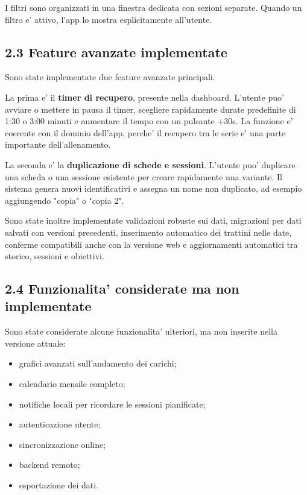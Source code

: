 \documentclass[11pt,a4paper]{article}
\begin{document}
I filtri sono organizzati in una finestra dedicata con sezioni separate. Quando un filtro e' attivo, l'app lo mostra esplicitamente all'utente.

\subsection{2.3 Feature avanzate implementate}

Sono state implementate due feature avanzate principali.

La prima e' il \textbf{timer di recupero}, presente nella dashboard. L'utente puo' avviare o mettere in pausa il timer, scegliere rapidamente durate predefinite di 1:30 o 3:00 minuti e aumentare il tempo con un pulsante +30s. La funzione e' coerente con il dominio dell'app, perche' il recupero tra le serie e' una parte importante dell'allenamento.

La seconda e' la \textbf{duplicazione di schede e sessioni}. L'utente puo' duplicare una scheda o una sessione esistente per creare rapidamente una variante. Il sistema genera nuovi identificativi e assegna un nome non duplicato, ad esempio aggiungendo "copia" o "copia 2".

Sono state inoltre implementate validazioni robuste sui dati, migrazioni per dati salvati con versioni precedenti, inserimento automatico dei trattini nelle date, conferme compatibili anche con la versione web e aggiornamenti automatici tra storico, sessioni e obiettivi.

\subsection{2.4 Funzionalita' considerate ma non implementate}

Sono state considerate alcune funzionalita' ulteriori, ma non inserite nella versione attuale:

\begin{itemize}
  \item grafici avanzati sull'andamento dei carichi;
  \item calendario mensile completo;
  \item notifiche locali per ricordare le sessioni pianificate;
  \item autenticazione utente;
  \item sincronizzazione online;
  \item backend remoto;
  \item esportazione dei dati.
\end{itemize}
\end{document}
